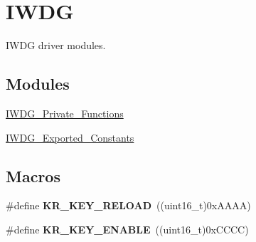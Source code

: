 \hypertarget{group___i_w_d_g}{}\section{I\+W\+D\+G}
\label{group___i_w_d_g}


I\+W\+D\+G driver modules.  


\subsection*{Modules}
\begin{DoxyCompactItemize}
\item 
\hyperlink{group___i_w_d_g___private___functions}{I\+W\+D\+G\+\_\+\+Private\+\_\+\+Functions}
\item 
\hyperlink{group___i_w_d_g___exported___constants}{I\+W\+D\+G\+\_\+\+Exported\+\_\+\+Constants}
\end{DoxyCompactItemize}
\subsection*{Macros}
\begin{DoxyCompactItemize}
\item 
\hypertarget{group___i_w_d_g_ga830a9a1bad16c7043c86545f4c159a50}{}\#define {\bfseries K\+R\+\_\+\+K\+E\+Y\+\_\+\+R\+E\+L\+O\+A\+D}~((uint16\+\_\+t)0x\+A\+A\+A\+A)\label{group___i_w_d_g_ga830a9a1bad16c7043c86545f4c159a50}

\item 
\hypertarget{group___i_w_d_g_gaeaa0dd2da3f9d0cce0d708cfff1df545}{}\#define {\bfseries K\+R\+\_\+\+K\+E\+Y\+\_\+\+E\+N\+A\+B\+L\+E}~((uint16\+\_\+t)0x\+C\+C\+C\+C)\label{group___i_w_d_g_gaeaa0dd2da3f9d0cce0d708cfff1df545}

\end{DoxyCompactItemize}
